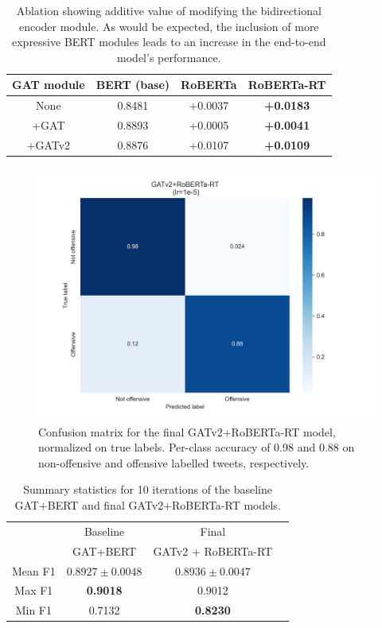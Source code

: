 \documentclass[letterpaper]{article} %
\begin{document}
\begin{table}
    \begin{tabular}{|c||c|c|c|}
        \hline
        GAT module & BERT (base) & RoBERTa & RoBERTa-RT  \\
        \hline 
        \hline
        None & 0.8481 & +0.0037 &  \textbf{+0.0183}  \\
        +GAT & 0.8893 & +0.0005 & \textbf{+0.0041} \\
        +GATv2 & 0.8876 & +0.0107 & \textbf{+0.0109} \\
        \hline
    \end{tabular}
    \caption{Ablation showing additive value of modifying the bidirectional encoder module. As would be expected, the inclusion of more expressive BERT modules leads to an increase in the end-to-end model's performance.}
\end{table}

\begin{figure}
    \includegraphics[width=\linewidth]{cm_final.png}
    \caption{Confusion matrix for the final GATv2+RoBERTa-RT model, normalized on true labels. Per-class accuracy of 0.98 and 0.88 on non-offensive and offensive labelled tweets, respectively.}
\end{figure}

\begin{table}
    \begin{tabular}{|c||c|c|c|}
        \hline
         & Baseline & Final  \\
         & GAT+BERT & GATv2 + RoBERTa-RT  \\
        \hline
        \hline 
        Mean F1  & $0.8927\pm0.0048$ & $\mathbf{0.8936 \pm 0.0047}$  \\
        Max F1 & \textbf{0.9018} & 0.9012 \\
        Min F1 & 0.7132 & \textbf{0.8230} \\
        \hline
    \end{tabular}
    \caption{Summary statistics for 10 iterations of the baseline GAT+BERT and final GATv2+RoBERTa-RT models.}
\end{table}
\end{document}
